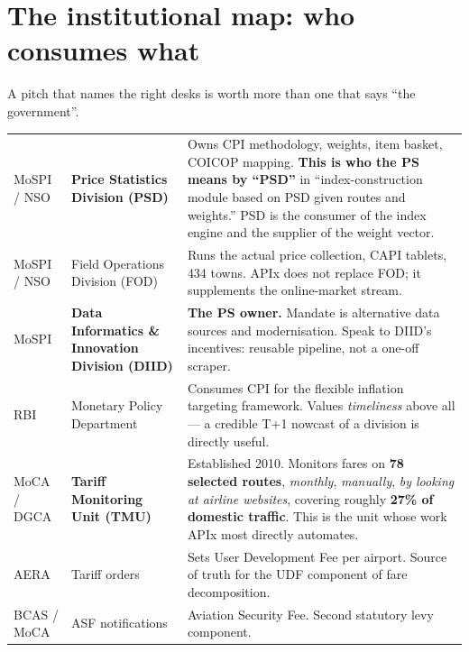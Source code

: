 \section{The institutional map: who consumes what}

A pitch that names the right desks is worth more than one that says ``the government''.

\begin{center}
\small
\begin{tabularx}{\textwidth}{@{}L{3.6cm} L{3.6cm} X@{}}
\toprule
{} &  &  \\
\midrule
MoSPI / NSO & \textbf{Price Statistics Division (PSD)} & Owns CPI methodology, weights, item basket, COICOP mapping. \textbf{This is who the PS means by ``PSD''} in ``index-construction module based on PSD given routes and weights.'' PSD is the consumer of the index engine and the supplier of the weight vector. \\
\addlinespace[2pt]
MoSPI / NSO & Field Operations Division (FOD) & Runs the actual price collection, CAPI tablets, 434 towns. APIx does not replace FOD; it supplements the online-market stream. \\
\addlinespace[2pt]
MoSPI & \textbf{Data Informatics \& Innovation Division (DIID)} & \textbf{The PS owner.} Mandate is alternative data sources and modernisation. Speak to DIID's incentives: reusable pipeline, not a one-off scraper. \\
\addlinespace[2pt]
RBI & Monetary Policy Department & Consumes CPI for the flexible inflation targeting framework. Values \emph{timeliness} above all --- a credible T$+$1 nowcast of a division is directly useful. \\
\addlinespace[2pt]
MoCA / DGCA & \textbf{Tariff Monitoring Unit (TMU)} & Established 2010. Monitors fares on \textbf{78 selected routes}, \emph{monthly}, \emph{manually}, \emph{by looking at airline websites}, covering roughly \textbf{27\% of domestic traffic}. This is the unit whose work APIx most directly automates. \\
\addlinespace[2pt]
AERA & Tariff orders & Sets User Development Fee per airport. Source of truth for the UDF component of fare decomposition. \\
\addlinespace[2pt]
BCAS / MoCA & ASF notifications & Aviation Security Fee. Second statutory levy component. \\
\bottomrule
\end{tabularx}
\end{center}

